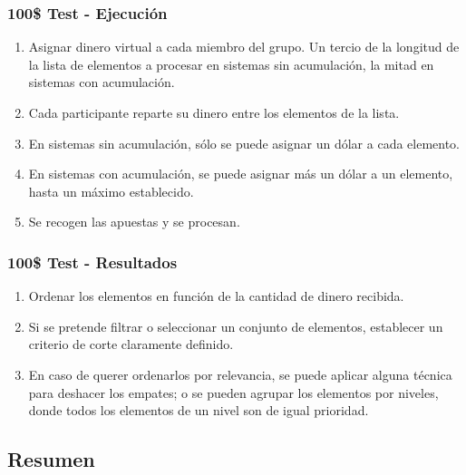 ﻿\documentclass[handout,a4paper,slidestop,xcolor=pst,dvips,blue]{beamer}
\begin{document}
\begin{frame}[c]
    \frametitle{100\$ Test - Ejecución}
    \begin{enumerate}[<+->]
        \item Asignar dinero virtual a cada miembro del grupo. Un tercio de la longitud de la lista de elementos a procesar en sistemas sin acumulación, la mitad en sistemas con acumulación.
        \item Cada participante reparte su dinero entre los elementos de la lista.
        \item En sistemas sin acumulación, sólo se puede asignar un dólar a cada elemento.
        \item En sistemas con acumulación, se puede asignar más un dólar a un elemento, hasta un máximo establecido.
        \item Se recogen las apuestas y se procesan.
    \end{enumerate}
\end{frame}

\begin{frame}[c]
    \frametitle{100\$ Test - Resultados}
    \begin{enumerate}[<+->]
        \item Ordenar los elementos en función de la cantidad de dinero recibida.
        \item Si se pretende filtrar o seleccionar un conjunto de elementos, establecer un criterio de corte claramente definido.
        \item En caso de querer ordenarlos por relevancia, se puede aplicar alguna técnica para deshacer los empates; o se pueden agrupar los elementos por niveles, donde todos los elementos de un nivel son de igual prioridad.
    \end{enumerate}
 \end{frame}

\subsection{Resumen}
\end{document}
